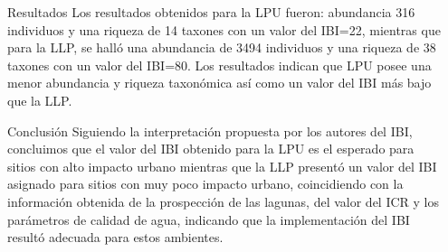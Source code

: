 \documentclass[final]{beamer}
\newlength{\sepwid}
\newlength{\onecolwid}
\begin{document}
\begin{frame}[t]
\begin{columns}[t]
\begin{column}{\onecolwid}
          
          
          \begin{block}{Resultados}
         Los resultados obtenidos para la LPU fueron: abundancia 316 individuos y una riqueza de 14 taxones con un valor del IBI=22, mientras que para la LLP, se halló una abundancia de 3494 individuos y una riqueza de 38 taxones con un valor del IBI=80. Los resultados indican que  LPU posee una menor abundancia y riqueza taxonómica así como un valor del IBI más bajo que la LLP. 

          \end{block}
          
          
          \begin{block}{Conclusión}
          Siguiendo la interpretación propuesta por los autores del IBI, concluimos que el valor del IBI obtenido para la LPU es el esperado para sitios con alto impacto urbano mientras que la LLP presentó un valor del IBI asignado para sitios con muy poco impacto urbano, coincidiendo con la información obtenida de la prospección de las lagunas, del valor del ICR y los parámetros de calidad de agua, indicando que  la implementación del IBI resultó adecuada para estos ambientes. 
          \end{block}
          
         \end{column}
                  
                  
                  
         \begin{column}{\sepwid}  \end{column}
         

\end{columns}
\end{frame}
\end{document}
